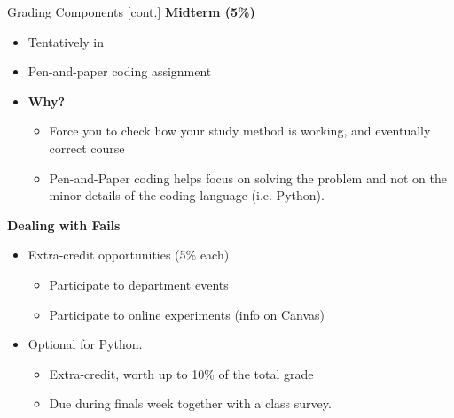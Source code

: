 \documentclass[professionalfonts, xcolor={usenames,svgnames,x11names,table}]{beamer}
\begin{document}
\begin{frame}{Grading Components [cont.]}
  \textbf{Midterm (5\%)}
 \begin{itemize}
            \item Tentatively in  
            \item Pen-and-paper coding assignment        
              \item \textbf{Why?}
                \begin{itemize}
                    \item Force you to check how your study method is working, and eventually correct course
                    \item Pen-and-Paper coding helps focus on solving the problem and not on the minor details of the coding language (i.e. Python).
                \end{itemize}    
            \end{itemize}
            \textbf{Dealing with Fails}
                \begin{itemize}
                                  \item Extra-credit opportunities (5\% each)
                     			     \begin{itemize}
          			  \item Participate to department events
                            \item Participate to online experiments (info on Canvas)
                                \end{itemize}
        \item Optional   for Python.
        			     \begin{itemize}
            		             \item Extra-credit, worth up to 10\% of the total grade
                                       \item Due during finals week together with a class survey.
                                \end{itemize}
                    \end{itemize}     
\end{frame}
\end{document}
